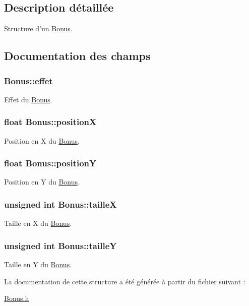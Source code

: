 \subsection{Description détaillée}
Structure d'un \hyperlink{structBonus}{Bonus}. 

\subsection{Documentation des champs}
\hypertarget{structBonus_a0619fdbeba9edd702a607887a7f79f62}{
\subsubsection[{effet}]{ Bonus\-::effet}}\label{structBonus_a0619fdbeba9edd702a607887a7f79f62}
Effet du \hyperlink{structBonus}{Bonus}. \hypertarget{structBonus_a299226996e549498df83b3768d3b43af}{
\subsubsection[{position\-X}]{\setlength{\rightskip}{0pt plus 5cm}float Bonus\-::position\-X}}\label{structBonus_a299226996e549498df83b3768d3b43af}
Position en X du \hyperlink{structBonus}{Bonus}. \hypertarget{structBonus_aa5cc7fbc0c3fe6b014900c7223a1d6cb}{
\subsubsection[{position\-Y}]{\setlength{\rightskip}{0pt plus 5cm}float Bonus\-::position\-Y}}\label{structBonus_aa5cc7fbc0c3fe6b014900c7223a1d6cb}
Position en Y du \hyperlink{structBonus}{Bonus}. \hypertarget{structBonus_aede925340da983fdddf1f901c976e00a}{
\subsubsection[{taille\-X}]{\setlength{\rightskip}{0pt plus 5cm}unsigned int Bonus\-::taille\-X}}\label{structBonus_aede925340da983fdddf1f901c976e00a}
Taille en X du \hyperlink{structBonus}{Bonus}. \hypertarget{structBonus_ae570700aa309f6de2f91fc84ddb409c2}{
\subsubsection[{taille\-Y}]{\setlength{\rightskip}{0pt plus 5cm}unsigned int Bonus\-::taille\-Y}}\label{structBonus_ae570700aa309f6de2f91fc84ddb409c2}
Taille en Y du \hyperlink{structBonus}{Bonus}. 

La documentation de cette structure a été générée à partir du fichier suivant \-:\begin{DoxyCompactItemize}
\item 
\hyperlink{Bonus_8h}{Bonus.\-h}\end{DoxyCompactItemize}
